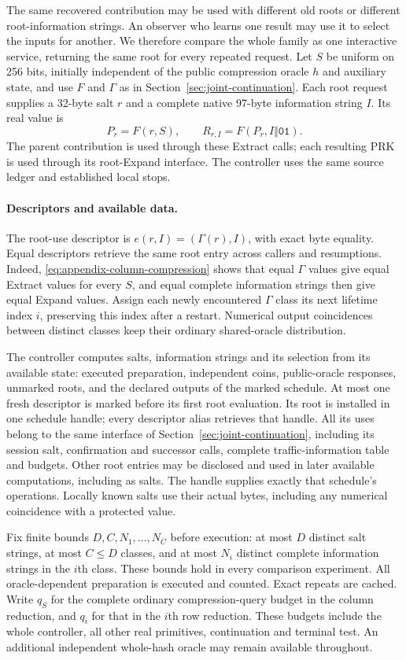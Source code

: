 \documentclass[pdflatex]{sn-jnl}
\theoremstyle{thmstyleone}
\theoremstyle{thmstylethree}
\theoremstyle{thmstyletwo}
\begin{document}
The same recovered contribution may be used with different old roots
or different root-information strings. An observer who learns one
result may use it to select the inputs for another. We therefore compare
the whole family as one interactive service, returning the same root
for every repeated request.
Let $S$ be uniform on 256 bits, initially independent of the public compression
oracle $h$ and auxiliary state, and use $F$ and $\Gamma$ as in
Section~\ref{sec:joint-continuation}. Each root request supplies a 32-byte
salt $r$ and a complete native 97-byte information string $I$. Its real value is
\[
 P_r=F(r,S),\qquad R_{r,I}=F(P_r,I\Vert\mathtt{01}).
\]
The parent contribution is used through these Extract calls; each resulting
PRK is used through its root-Expand interface. The controller uses the
same source ledger and established local stops.

\paragraph{Descriptors and available data.}
The root-use descriptor is
$e(r,I)=(\Gamma(r),I)$, with exact byte equality. Equal descriptors retrieve
the same root entry across callers and resumptions. Indeed,
\eqref{eq:appendix-column-compression} shows that equal $\Gamma$ values give
equal Extract values for every $S$, and equal complete information strings
then give equal Expand values. Assign each newly encountered $\Gamma$ class
its next lifetime index $i$, preserving this index after a restart.
Numerical output coincidences between distinct classes keep their ordinary
shared-oracle distribution.

The controller computes salts, information strings and its selection from
its available state: executed preparation, independent coins, public-oracle
responses, unmarked roots, and the declared outputs of the marked schedule.
At most one fresh descriptor is marked before its first root evaluation.
Its root is installed in one schedule handle; every descriptor alias
retrieves that handle. All its uses belong to the same interface of
Section~\ref{sec:joint-continuation}, including its session salt, confirmation
and successor calls, complete traffic-information table and budgets. Other
root entries may be disclosed and used in later available computations,
including as salts. The handle supplies exactly that schedule's
operations. Locally known salts use their actual bytes, including any
numerical coincidence with a protected value.

Fix finite bounds $D,C,N_1,\ldots,N_C$ before execution: at most $D$ distinct
salt strings, at most $C\le D$ classes, and at most $N_i$ distinct complete
information strings in the $i$th class. These bounds hold in every comparison
experiment. All oracle-dependent preparation is executed and counted. Exact
repeats are cached. Write $q_S$ for the complete ordinary compression-query
budget in the column reduction, and $q_i$ for that in the $i$th row reduction.
These budgets include the whole controller, all other real primitives,
continuation and terminal test. An additional independent whole-hash oracle
may remain available throughout.
\end{document}
